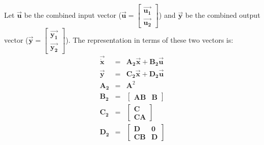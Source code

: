     Let $\vec{\mathbf{u}}$ be the combined input vector
($\vec{\mathbf{u}} = \left [ \begin{array} {c} \vec{\mathbf{u_1}}
\\ \vec{\mathbf{u_2}} \end{array} \right ]$) and $\vec{\mathbf{y}}$ be the combined output vector
($\vec{\mathbf{y}} = \left [ \begin{array} {c} \vec{\mathbf{y_1}}
\\ \vec{\mathbf{y_2}} \end{array} \right ]$). The representation in terms of these two
vectors is:
\begin{eqnarray*}
\vec{\dot{\mathbf{x}}} & = & \mathbf{A_2}\vec{\mathbf{x}} + \mathbf{B_2}\vec{\mathbf{u}} \\
\vec{\mathbf{y}} & = & \mathbf{C_2}\vec{\mathbf{x}} + \mathbf{D_2}\vec{\mathbf{u}} \\
\mathbf{A_2} & = & \mathbf{A}^2 \\
\mathbf{B_2} & = & \left [ \begin{array} {cc} \mathbf{AB} & \mathbf{B} \end{array} \right ] \\
\mathbf{C_2} & = & \left [ \begin{array} {c} \mathbf{C} \\
\mathbf{CA} \end{array} \right ] \\
\mathbf{D_2} & = & \left [ \begin{array} {cc} \mathbf{D} & \mathbf{0} \\
\mathbf{CB} & \mathbf{D} \end{array} \right ]
\end{eqnarray*}

